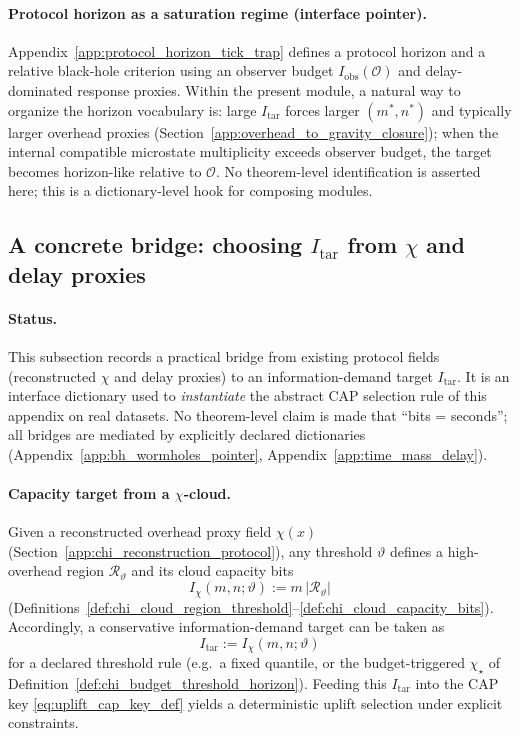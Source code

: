 \paragraph{Protocol horizon as a saturation regime (interface pointer).}
\InterfaceTag Appendix~\ref{app:protocol_horizon_tick_trap} defines a protocol horizon and a relative black-hole criterion using an observer budget $I_{\mathrm{obs}}(\mathcal O)$ and delay-dominated response proxies.
Within the present module, a natural way to organize the horizon vocabulary is:
large $I_{\mathrm{tar}}$ forces larger $(m^\ast,n^\ast)$ and typically larger overhead proxies (Section~\ref{app:overhead_to_gravity_closure});
when the internal compatible microstate multiplicity exceeds observer budget, the target becomes horizon-like relative to $\mathcal O$.
No theorem-level identification is asserted here; this is a dictionary-level hook for composing modules.

\subsection{A concrete bridge: choosing \texorpdfstring{$I_{\mathrm{tar}}$}{I_tar} from \texorpdfstring{$\chi$}{chi} and delay proxies}
\label{subsec:uplift_I_tar_from_chi_delay}

\paragraph{Status.}
\InterfaceTag This subsection records a practical bridge from existing protocol fields (reconstructed $\chi$ and delay proxies) to an information-demand target $I_{\mathrm{tar}}$.
It is an interface dictionary used to \emph{instantiate} the abstract CAP selection rule of this appendix on real datasets.
No theorem-level claim is made that ``bits = seconds''; all bridges are mediated by explicitly declared dictionaries (Appendix~\ref{app:bh_wormholes_pointer}, Appendix~\ref{app:time_mass_delay}).

\paragraph{Capacity target from a $\chi$-cloud.}
\InterfaceTag Given a reconstructed overhead proxy field $\chi(x)$ (Section~\ref{app:chi_reconstruction_protocol}), any threshold $\vartheta$ defines a high-overhead region $\mathcal R_\vartheta$ and its cloud capacity bits
\[
I_\chi(m,n;\vartheta):=m\,|\mathcal R_\vartheta|
\]
(Definitions~\ref{def:chi_cloud_region_threshold}--\ref{def:chi_cloud_capacity_bits}).
Accordingly, a conservative information-demand target can be taken as
\[
I_{\mathrm{tar}}:=I_\chi(m,n;\vartheta)
\]
for a declared threshold rule (e.g.\ a fixed quantile, or the budget-triggered $\chi_\star$ of Definition~\ref{def:chi_budget_threshold_horizon}).
Feeding this $I_{\mathrm{tar}}$ into the CAP key \eqref{eq:uplift_cap_key_def} yields a deterministic uplift selection under explicit constraints.

